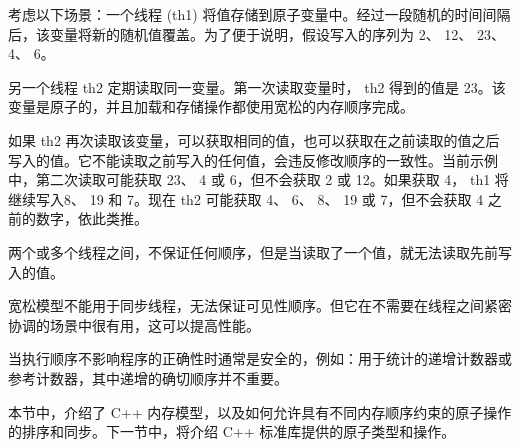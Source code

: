 考虑以下场景：一个线程 (th1) 将值存储到原子变量中。经过一段随机的时间间隔后，该变量将新的随机值覆盖。为了便于说明，假设写入的序列为 2、 12、 23、 4、 6。

另一个线程 th2 定期读取同一变量。第一次读取变量时， th2 得到的值是 23。该变量是原子的，并且加载和存储操作都使用宽松的内存顺序完成。

如果 th2 再次读取该变量，可以获取相同的值，也可以获取在之前读取的值之后写入的值。它不能读取之前写入的任何值，会违反修改顺序的一致性。当前示例中，第二次读取可能获取 23、 4 或 6，但不会获取 2 或 12。如果获取 4， th1 将继续写入8、 19 和 7。现在 th2 可能获取 4、 6、 8、 19 或 7，但不会获取 4 之前的数字，依此类推。

两个或多个线程之间，不保证任何顺序，但是当读取了一个值，就无法读取先前写入的值。

宽松模型不能用于同步线程，无法保证可见性顺序。但它在不需要在线程之间紧密协调的场景中很有用，这可以提高性能。

当执行顺序不影响程序的正确性时通常是安全的，例如：用于统计的递增计数器或参考计数器，其中递增的确切顺序并不重要。

本节中，介绍了 C++ 内存模型，以及如何允许具有不同内存顺序约束的原子操作的排序和同步。下一节中，将介绍 C++ 标准库提供的原子类型和操作。











































